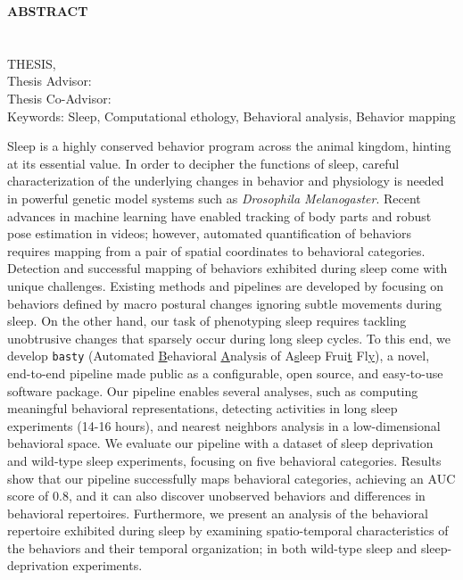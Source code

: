 \clearpage
\begin{center}
	\MakeUppercase{\textbf{Abstract}} \\ [3\baselineskip]
	\MakeUppercase{\thesistitle} \\[3\baselineskip]
	\MakeUppercase{\student} \\[\baselineskip]
	\MakeUppercase{\major \degreeabv Thesis, \month~\year} \\[\baselineskip]
	Thesis Advisor: \advisor \\
	Thesis Co-Advisor: \coadvisor \\
	[2\baselineskip]
	Keywords: Sleep, Computational ethology, Behavioral analysis, Behavior mapping \\[2\baselineskip]
\end{center}

\singlespacing

Sleep is a highly conserved behavior program across the animal kingdom, hinting at its essential value.
In order to decipher the functions of sleep, careful characterization of the underlying changes in behavior and physiology is needed in powerful genetic model systems such as \textit{Drosophila Melanogaster}.
Recent advances in machine learning have enabled tracking of body parts and robust pose estimation in videos; however, automated quantification of behaviors requires mapping from a pair of spatial coordinates to behavioral categories.
Detection and successful mapping of behaviors exhibited during sleep come with unique challenges.
Existing methods and pipelines are developed by focusing on behaviors defined by macro postural changes ignoring subtle movements during sleep.
On the other hand, our task of phenotyping sleep requires tackling unobtrusive changes that sparsely occur during long sleep cycles.
To this end, we develop \texttt{basty} (Automated \underline{B}ehavioral \underline{A}nalysis of A\underline{s}leep Frui\underline{t} Fl\underline{y}), a novel, end-to-end pipeline made public as a configurable, open source, and easy-to-use software package.
Our pipeline enables several analyses, such as computing meaningful behavioral representations, detecting activities in long sleep experiments (14-16 hours), and nearest neighbors analysis in a low-dimensional behavioral space.
We evaluate our pipeline with a dataset of sleep deprivation and wild-type sleep experiments, focusing on five behavioral categories.
Results show that our pipeline successfully maps behavioral categories, achieving an AUC score of 0.8, and it can also discover unobserved behaviors and differences in behavioral repertoires.
Furthermore, we present an analysis of the behavioral repertoire exhibited during sleep by examining spatio-temporal characteristics of the behaviors and their temporal organization; in both wild-type sleep and sleep-deprivation experiments.

